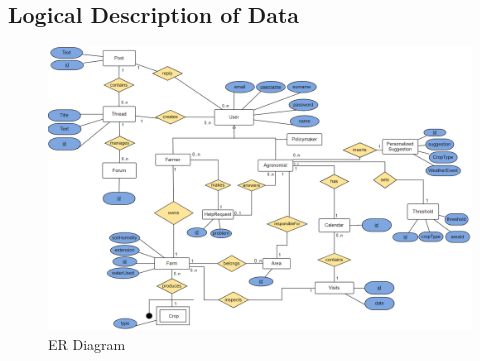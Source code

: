 \newpage
\subsection{Logical Description of Data}
\begin{figure}[H]
    \includegraphics[width=\textwidth,height=\textheight,keepaspectratio]{Images/erDiagram.png}
    \caption{ER Diagram}
    \label{fig:er_diagram}
\end{figure}
